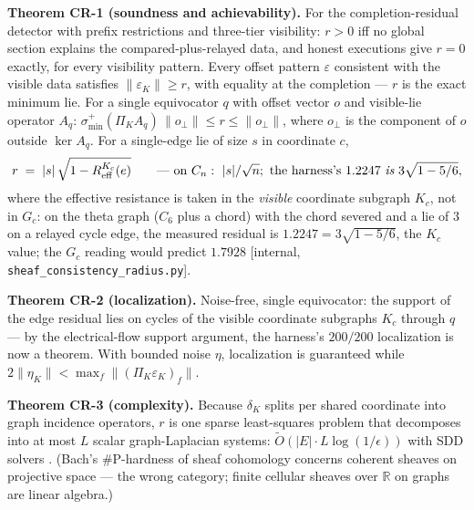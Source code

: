 \documentclass[11pt,a4paper]{article}
\begin{document}
\begin{thebox}
\textbf{Theorem CR-1 (soundness and achievability).} For the completion-residual detector with prefix restrictions and
three-tier visibility: $r>0$ iff no global section explains the compared-plus-relayed data, and honest executions give
$r=0$ exactly, for every visibility pattern. Every offset pattern $\varepsilon$ consistent with the visible data satisfies
$\|\varepsilon_K\|\ge r$, with equality at the completion --- $r$ is the exact minimum lie. For a single equivocator $q$
with offset vector $o$ and visible-lie operator $A_q$:
$\sigma^{+}_{\min}(\Pi_K A_q)\,\|o_\perp\|\le r\le\|o_\perp\|$, where $o_\perp$ is the component of $o$ outside
$\ker A_q$. For a single-edge lie of size $s$ in coordinate $c$,
\[
r \;=\; |s|\,\sqrt{1-R^{K_c}_{\mathrm{eff}}(e)}
\qquad\text{--- on } C_n:\ |s|/\sqrt{n};\ \text{the harness's }1.2247\ \emph{is}\ 3\sqrt{1-5/6},
\]
where the effective resistance is taken in the \emph{visible} coordinate subgraph $K_c$, not in $G_c$: on the theta graph
($C_6$ plus a chord) with the chord severed and a lie of $3$ on a relayed cycle edge, the measured residual is
$1.2247=3\sqrt{1-5/6}$, the $K_c$ value; the $G_c$ reading would predict $1.7928$
[internal, \texttt{sheaf\_consistency\_radius.py}].

\textbf{Theorem CR-2 (localization).} Noise-free, single equivocator: the support of the edge residual lies on cycles of
the visible coordinate subgraphs $K_c$ through $q$ --- by the electrical-flow support argument, the harness's $200/200$
localization is now a theorem. With bounded noise $\eta$, localization is guaranteed while
$2\|\eta_K\|<\max_f\|(\Pi_K\varepsilon_K)_f\|$.

\textbf{Theorem CR-3 (complexity).} Because $\delta_K$ splits per shared coordinate into graph incidence operators, $r$ is
one sparse least-squares problem that decomposes into at most $L$ scalar graph-Laplacian systems:
$\widetilde{O}(|E|\cdot L\log(1/\epsilon))$ with SDD solvers \cite{spielman-teng}. (Bach's \#P-hardness of sheaf cohomology
\cite{bach} concerns coherent sheaves on projective space --- the wrong category; finite cellular sheaves over $\mathbb{R}$
on graphs are linear algebra.)


\end{thebox}
\end{document}
